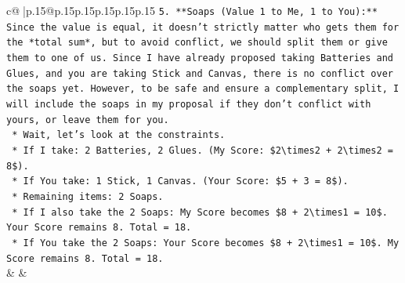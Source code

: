 \documentclass{article}
\begin{document}
{\begin{supertabular}{c@{$\;$}|p{.15\linewidth}@{}p{.15\linewidth}p{.15\linewidth}p{.15\linewidth}p{.15\linewidth}p{.15\linewidth}}
{{{\texttt{5.  **Soaps (Value 1 to Me, 1 to You):** Since the value is equal, it doesn't strictly matter who gets them for the *total sum*, but to avoid conflict, we should split them or give them to one of us. Since I have already proposed taking Batteries and Glues, and you are taking Stick and Canvas, there is no conflict over the soaps yet. However, to be safe and ensure a complementary split, I will include the soaps in my proposal if they don't conflict with yours, or leave them for you.} \\
\texttt{    *   Wait, let's look at the constraints.} \\
\texttt{    *   If I take: 2 Batteries, 2 Glues. (My Score: \$2\textbackslash{}times2 + 2\textbackslash{}times2 = 8\$).} \\
\texttt{    *   If You take: 1 Stick, 1 Canvas. (Your Score: \$5 + 3 = 8\$).} \\
\texttt{    *   Remaining items: 2 Soaps.} \\
\texttt{    *   If I also take the 2 Soaps: My Score becomes \$8 + 2\textbackslash{}times1 = 10\$. Your Score remains 8. Total = 18.} \\
\texttt{    *   If You take the 2 Soaps: Your Score becomes \$8 + 2\textbackslash{}times1 = 10\$. My Score remains 8. Total = 18.} \\
            }
        }
    }
    & & \\ \\


\end{supertabular}}
\end{document}

